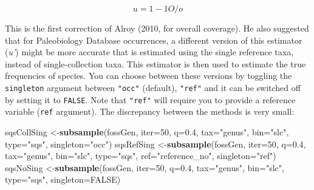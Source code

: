 \documentclass[]{article}
\newenvironment{Shaded}{\begin{snugshade}}{\end{snugshade}}
\newcommand{\KeywordTok}[1]{\textcolor[rgb]{0.13,0.29,0.53}{\textbf{{#1}}}}
\newcommand{\DataTypeTok}[1]{\textcolor[rgb]{0.13,0.29,0.53}{{#1}}}
\newcommand{\DecValTok}[1]{\textcolor[rgb]{0.00,0.00,0.81}{{#1}}}
\newcommand{\FloatTok}[1]{\textcolor[rgb]{0.00,0.00,0.81}{{#1}}}
\newcommand{\StringTok}[1]{\textcolor[rgb]{0.31,0.60,0.02}{{#1}}}
\newcommand{\OtherTok}[1]{\textcolor[rgb]{0.56,0.35,0.01}{{#1}}}
\newcommand{\NormalTok}[1]{{#1}}
\begin{document}
\[u = 1 - {1}O/o\]

This is the first correction of Alroy (2010, for overall coverage). He
also suggested that for Paleobiology Database occurrences, a different
version of this estimator (\emph{u'}) might be more accurate that is
estimated using the single reference taxa, instead of single-collection
taxa. This estimator is then used to estimate the true frequencies of
species. You can choose between these versions by toggling the
\texttt{singleton} argument between \texttt{"occ"} (default),
\texttt{"ref"} and it can be switched off by setting it to
\texttt{FALSE}. Note that \texttt{"ref"} will require you to provide a
reference variable (\texttt{ref} argument). The discrepancy between the
methods is very small:

\begin{Shaded}
\begin{Highlighting}[]
\NormalTok{sqsCollSing <-}\KeywordTok{subsample}\NormalTok{(fossGen, }\DataTypeTok{iter=}\DecValTok{50}\NormalTok{, }\DataTypeTok{q=}\FloatTok{0.4}\NormalTok{, }
  \DataTypeTok{tax=}\StringTok{"genus"}\NormalTok{, }\DataTypeTok{bin=}\StringTok{"slc"}\NormalTok{, }\DataTypeTok{type=}\StringTok{"sqs"}\NormalTok{, }
  \DataTypeTok{singleton=}\StringTok{"occ"}\NormalTok{)}
\NormalTok{sqsRefSing <-}\KeywordTok{subsample}\NormalTok{(fossGen, }\DataTypeTok{iter=}\DecValTok{50}\NormalTok{, }\DataTypeTok{q=}\FloatTok{0.4}\NormalTok{,}
  \DataTypeTok{tax=}\StringTok{"genus"}\NormalTok{, }\DataTypeTok{bin=}\StringTok{"slc"}\NormalTok{, }\DataTypeTok{type=}\StringTok{"sqs"}\NormalTok{, }\DataTypeTok{ref=}\StringTok{"reference_no"}\NormalTok{,}
  \DataTypeTok{singleton=}\StringTok{"ref"}\NormalTok{)}
\NormalTok{sqsNoSing <-}\KeywordTok{subsample}\NormalTok{(fossGen, }\DataTypeTok{iter=}\DecValTok{50}\NormalTok{, }\DataTypeTok{q=}\FloatTok{0.4}\NormalTok{,}
  \DataTypeTok{tax=}\StringTok{"genus"}\NormalTok{, }\DataTypeTok{bin=}\StringTok{"slc"}\NormalTok{, }\DataTypeTok{type=}\StringTok{"sqs"}\NormalTok{, }\DataTypeTok{singleton=}\OtherTok{FALSE}\NormalTok{)}


\end{Highlighting}
\end{Shaded}
\end{document}
